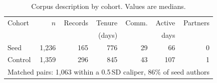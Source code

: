 \begin{table}[!t]
\caption{Corpus description by cohort. Values are medians.}
\label{tab:corpus}
\centering
\begin{tabular}{lrrrrrr}
\toprule
Cohort & $n$ & Records & Tenure & Comm. & Active & Partners \\
 & & & (days) & & days & \\
\midrule
Seed & 1,236 & 165 & 776 & 29 & 66 & 0 \\
Control & 1,359 & 296 & 845 & 43 & 107 & 1 \\
\midrule
\multicolumn{7}{l}{Matched pairs: 1,063 within a 0.5\,SD caliper, 86\% of seed authors} \\
\bottomrule
\end{tabular}
\end{table}
